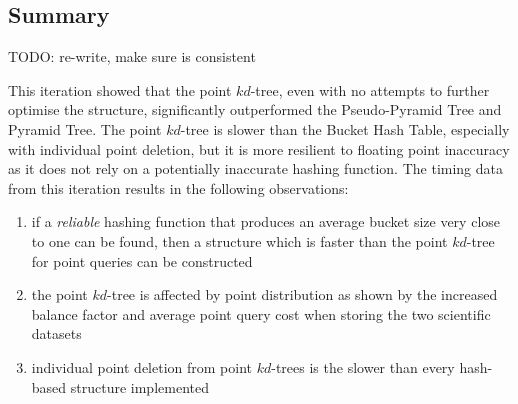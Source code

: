 \subsection{Summary}

TODO: re-write, make sure is consistent

This iteration showed that the point $kd$-tree, even with no attempts to further optimise the structure, significantly outperformed the Pseudo-Pyramid Tree and Pyramid Tree. The point $kd$-tree is slower than the Bucket Hash Table, especially with individual point deletion, but it is more resilient to floating point inaccuracy as it does not rely on a potentially inaccurate hashing function. The timing data from this iteration results in the following observations:
\begin{enumerate}[noitemsep]
	\item if a \textit{reliable} hashing function that produces an average bucket size very close to one can be found, then a structure which is faster than the point $kd$-tree for point queries can be constructed
	\item the point $kd$-tree is affected by point distribution as shown by the increased balance factor and average point query cost when storing the two scientific datasets
	\item individual point deletion from point $kd$-trees is the slower than every hash-based structure implemented
\end{enumerate}

